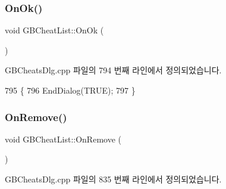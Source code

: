 \subsubsection{\texorpdfstring{On\+Ok()}{OnOk()}}
{\footnotesize\ttfamily void G\+B\+Cheat\+List\+::\+On\+Ok (\begin{DoxyParamCaption}{ }\end{DoxyParamCaption})\hspace{0.3cm}{\ttfamily [protected]}}



G\+B\+Cheats\+Dlg.\+cpp 파일의 794 번째 라인에서 정의되었습니다.


\begin{DoxyCode}
795 \{
796   EndDialog(TRUE);
797 \}
\end{DoxyCode}
\mbox{\label{class_g_b_cheat_list_ae8c2c668dbb6ab9989c50efc60448a54}} 
\subsubsection{\texorpdfstring{On\+Remove()}{OnRemove()}}
{\footnotesize\ttfamily void G\+B\+Cheat\+List\+::\+On\+Remove (\begin{DoxyParamCaption}{ }\end{DoxyParamCaption})\hspace{0.3cm}{\ttfamily [protected]}}



G\+B\+Cheats\+Dlg.\+cpp 파일의 835 번째 라인에서 정의되었습니다.


